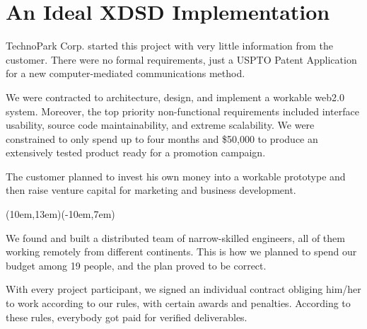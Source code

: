 \documentclass[12pt,letterpaper,oneside]{article}
\newcommand{\enru}[2]{#1}
\begin{document}
\section*{\enru{An Ideal XDSD Implementation}{Пример внедрения}}

    \enru{
        TechnoPark Corp. started this project with very little information from
        the customer.
        There were no formal requirements, just a USPTO Patent Application
        for a new computer-mediated
        communications method.
    }{
        Мы начали работу над проектом имея очень мало информации
        от заказчика. Мы не имели формальных требований к продукту, лишь
        патент на новый метод интернет коммуникаций.
    }

    \enru{
        We were contracted to architecture, design, and implement
        a workable web2.0 system. Moreover, the top priority non-functional
        requirements included interface usability, source code maintainability, and
        extreme scalability.
        We were constrained to only spend up to four months and \$50,000
        to produce an extensively tested product ready for a promotion campaign.
    }{
        По контракты мы должны были разработать архитектуру и создать
        работающую веб-систему. Более того, приоритетными требованиями были
        удобство интерфейса пользователя, качество исходного кода и
        расширяемость системы.
    }

    \enru{
        The customer planned to invest his own money into
        a workable prototype and then raise venture capital
        for marketing and business development.
    }{
        Заказчик планировал инвестировать собственные средства в создание
        рабочего прототипа системы и затем получить инвестиции
        для развития и рекламы.
    }

    \parpic(10em,13em)(-10em,7em){}

    \enru{
        We found and built a distributed team of narrow-skilled engineers,
        all of them working remotely from different continents.
        This is how we planned to spend our budget among 19 people, and the plan
        proved to be correct.
    }{
        Мы собрали и организовали распределенную команду узкоквалифицированных инженеров,
        работающих с нами удаленно с разных континентов. Вот так мы планировали
        распределить наш бюджет среди 19-ти человек, и этот план оказался верным:
    }

    \enru{
        With every project participant, we signed an individual
        contract obliging him/her to work according to our rules,
        with certain awards and penalties. According to these rules,
        everybody got paid for verified deliverables.
    }{
        С каждым участником проекта мы подписали индвидиуальный контракт,
        обязывающий его работать по нашим правилам, с определенным вознаграждением
        и штрафами. По этим правилам каждый получал оплату за
        переданные нам результаты.
    }
\end{document}
